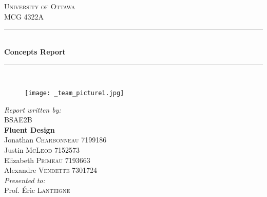 \documentclass[12pt,twoside]{article}
\begin{document}
	
	\begin{titlepage}
		
		\newcommand{\HRule}{\rule{\linewidth}{0.5mm}} %
		
		\begin{center} %
			
			
			\textsc{\LARGE University of Ottawa}\\[1.0cm] %
			\textsc{\Large MCG 4322A}\\[0.5cm] %
			
			
			\HRule \\[0.4cm]
			{ \huge \bfseries Concepts Report}\\[0.4cm] %
			\HRule \\[0.5cm]
			
			\begin{figure}[H]
				\centering
				\texttt{[image: \_team\_picture1.jpg]} %
			\end{figure}
			
			
			\emph{Report written by:}\\[0.5cm]
			BSAE2B\\
			\textbf{Fluent Design}\\
			Jonathan \textsc{Charbonneau} 7199186\\
			Justin \textsc{McLeod} 7152573\\
			Elizabeth \textsc{Primeau} 7193663\\
			Alexandre \textsc{Vendette} 7301724\\[1cm]
			\emph{Presented to:}\\[0.5cm]
			Prof. Éric \textsc{Lanteigne}\\[1.5cm]
			

\end{center}
\end{titlepage}
\end{document}
